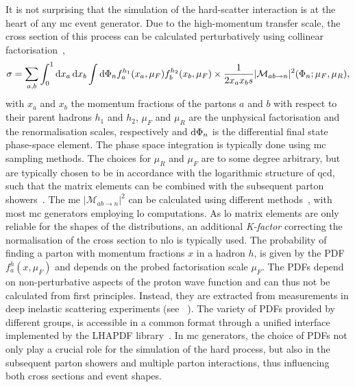 It is not surprising that the simulation of the hard-scatter interaction is at the heart of any \gls{mc} event generator. Due to the high-momentum transfer scale, the cross section of this process can be calculated perturbatively using collinear factorisation~\cite{Buckley:2011ms},
\begin{equation}
	\sigma = \sum_{a,b}{\int_0^1{\mathop{}\!\mathrm{d} x_a \mathop{}\!\mathrm{d} x_b\int{\mathop{}\!\mathrm{d}\Phi_n f_a^{h_1}(x_a,\mu_F) f_b^{h_2}(x_b,\mu_F)} \times \frac{1}{2 x_a x_b s}\vert \mathcal{M}_{ab\rightarrow n} \vert^2 (\Phi_n; \mu_F,\mu_R)}},
\end{equation}
with $x_a$ and $x_b$ the momentum fractions of the partons $a$ and $b$ with respect to their parent hadrons $h_1$ and $h_2$, $\mu_F$ and $\mu_R$ are the unphysical factorisation and the renormalisation scales, respectively and $\mathop{}\!\mathrm{d}\Phi_n$ is the differential final state phase-space element. The phase space integration is typically done using \gls{mc} sampling methods. The choices for $\mu_R$ and $\mu_F$ are to some degree arbitrary, but are typically chosen to be in accordance with the logarithmic structure of \gls{qcd}, such that the matrix elements can be combined with the subsequent parton showers~\cite{Buckley:2011ms}. The \gls{me} $\vert\mathcal{M}_{ab\rightarrow n}\vert^2$ can be calculated using different methods~\cite{Buckley:2011ms}, with most \gls{mc} generators employing \gls{lo} computations. As \gls{lo} matrix elements are only reliable for the shapes of the distributions, an additional \textit{K-factor} correcting the normalisation of the cross section to \gls{nlo} is typically used. The probability of finding a parton with momentum fractions $x$ in a hadron $h$, is given by the \gls{PDF} $f_a^{h}(x,\mu_F)$ and depends on the probed factorisation scale $\mu_F$. The \glspl{PDF} depend on non-perturbative aspects of the proton wave function and can thus not be calculated from first principles. Instead, they are extracted from measurements in deep inelastic scattering experiments (see \eg~\cite{Gribov:1972ri, Blumlein:1996wj}). The variety of \glspl{PDF} provided by different groups, is accessible in a common format through a unified interface implemented by the LHAPDF library~\cite{Buckley:2014ana}. In \gls{mc} generators, the choice of \glspl{PDF} not only play a crucial role for the simulation of the hard process, but also in the subsequent parton showers and multiple parton interactions, thus influencing both cross sections and event shapes.

